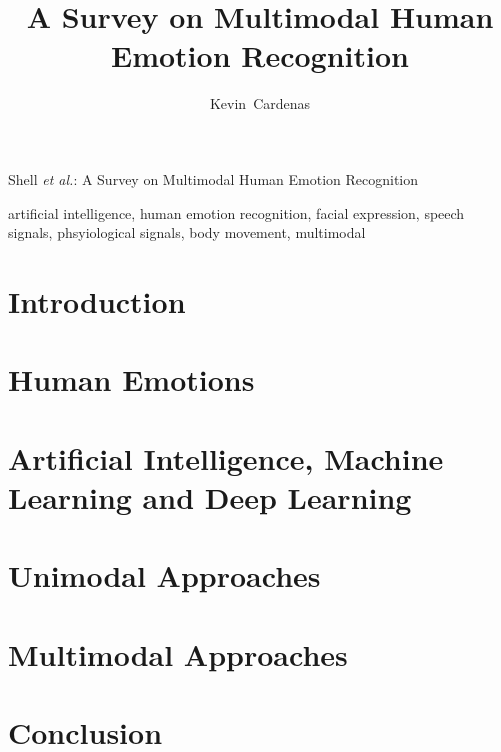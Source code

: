 \documentclass[journal]{IEEEtran}
\begin{document}
\title{A Survey on Multimodal Human Emotion Recognition}

\author{Kevin~Cardenas}

%
{Shell \MakeLowercase{\textit{et al.}}: A Survey on Multimodal Human Emotion Recognition}

\maketitle


\begin{abstract}
    
\end{abstract}

\begin{IEEEkeywords}
    artificial intelligence, human emotion recognition, facial expression, speech signals, phsyiological signals, body movement, multimodal
\end{IEEEkeywords}


\IEEEpeerreviewmaketitle

\section{Introduction}
    

\section{Human Emotions}
    

\section{Artificial Intelligence, Machine Learning and Deep Learning}
    

\section{Unimodal Approaches}
    
    
\section{Multimodal Approaches}
    

\section{Conclusion}
    

\newpage


\end{document}

